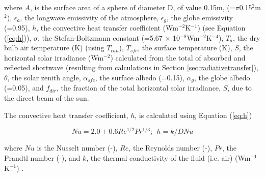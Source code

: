 \documentclass[final,3p,times,authoryear]{elsarticle}
\begin{document}
where $A$, is the surface area of a sphere of diameter D, of value 0.15m, (=$\pi$0.15$^{2}$m$^{2}$),
$\epsilon_{a}$, the longwave emissivity of the atmosphere, 
$\epsilon_{g}$, the globe emissivity (=0.95), 
$h$, the convective heat transfer coefficient (Wm$^{-2}$K$^{-1}$) (see Equation (\ref{eq:h})), 
$\sigma$, the Stefan-Boltzmann constant (=5.67 $\times$ 10$^{-8}$Wm$^{-2}$K$^{-4}$), 
$T_{a}$, the dry bulb air temperature (K) (using $T_{can}$), 
$T_{sfc}$, the surface temperature (K), 
$S$, the horizontal solar irradiance (Wm$^{-2}$) calculated from the total of absorbed and reflected shortwave (resulting from calculations in Section \ref{sec:radiativetransfer}), 
$\theta$, the solar zenith angle, 
$\alpha_{sfc}$, the surface albedo (=0.15),  
$\alpha_{g}$, the globe albedo (=0.05), and 
$f_{dir}$, the fraction of the total horizontal solar irradiance, $S$, due to the direct
beam of the sun. 


The convective heat transfer coefficient, $h$, is calculated using Equation (\ref{eq:h})

\begin{equation}\label{eq:h}
Nu = 2.0 + 0.6Re^{1/2}Pr^{1/3};  ~~h = k / D Nu
\end{equation}

where $Nu$ is the Nusselt number (-),
$Re$, the Reynolds number (-),
$Pr$, the Prandtl number (-), and 
$k$, the thermal conductivity of the fluid (i.e. air) (Wm$^{-1}$K$^{-1}$) \citep{Liljegren2008}.

\end{document}
